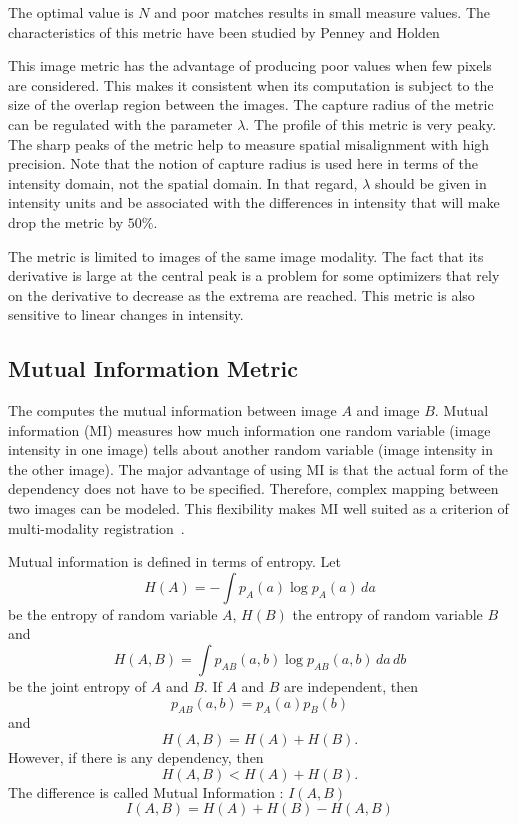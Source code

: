The optimal value is $N$ and poor matches results in small measure values.
The characteristics of this metric have been studied by Penney and Holden
\cite{Holden1999}\cite{Penney1998}

This image metric has the advantage of producing poor values when few pixels
are considered.  This makes it consistent when its computation is subject to
the size of the overlap region between the images. The capture radius of the
metric can be regulated with the parameter $\lambda$.  The profile of this
metric is very peaky. The sharp peaks of the metric help to measure spatial
misalignment with high precision. Note that the notion of capture radius is
used here in terms of the intensity domain, not the spatial domain. In that
regard, $\lambda$ should be given in intensity units and be associated with
the differences in intensity that will make drop the metric by $50\%$.

The metric is limited to images of the same image modality.  The
fact that its derivative is large at the central peak is a problem for some
optimizers that rely on the derivative to decrease as the extrema are
reached.  This metric is also sensitive to linear changes in intensity.


\subsection{Mutual Information Metric}
\label{sec:MutualInformationMetric}

The  computes the mutual
information between image $A$ and image $B$.  Mutual information (MI)
measures how much information one random variable (image intensity in one
image) tells about another random variable (image intensity in the other
image). The major advantage of using MI is that the actual form of the
dependency does not have to be specified.  Therefore, complex mapping between
two images can be modeled.  This flexibility makes MI well suited as a
criterion of multi-modality registration~\cite{Pluim2003}.

Mutual information is defined in terms of entropy. Let
\begin{equation}
H(A) = - \int p_A(a) \log p_A(a)\, da
\end{equation}
be the entropy of random variable $A$, $H(B)$ the entropy of
random variable $B$ and
\begin{equation}
H(A,B) = \int p_{AB}(a,b) \log p_{AB}(a,b)\,da\,db
\end{equation}
be the joint entropy of $A$ and $B$. If $A$ and $B$ are independent, then
\begin{equation}
p_{AB}(a,b) = p_A(a) p_B(b)
\end{equation}
and
\begin{equation}
H(A,B) = H(A) + H(B).
\end{equation}
However, if there is any dependency, then
\begin{equation}
H(A,B)<H(A)+H(B).
\end{equation}
The difference is called Mutual Information : \( I(A,B) \)
\begin{equation}
I(A,B)=H(A)+H(B)-H(A,B)
\end{equation}

